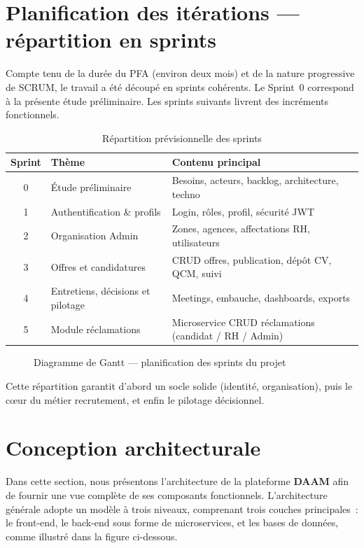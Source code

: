 \section{Planification des itérations --- répartition en sprints}

Compte tenu de la durée du PFA (environ deux mois) et de la nature progressive
de SCRUM, le travail a été découpé en sprints cohérents. Le Sprint~0 correspond
à la présente étude préliminaire. Les sprints suivants livrent des incréments
fonctionnels.

\begin{table}[htbp]
  \centering
  \small
  \caption{Répartition prévisionnelle des sprints}
  \label{tab:sprints-plan}
  \begin{tabular}{|c|p{3.6cm}|p{7.2cm}|}
    \hline
    \textbf{Sprint} & \textbf{Thème} & \textbf{Contenu principal} \\
    \hline
    0 & Étude préliminaire & Besoins, acteurs, backlog, architecture, techno \\
    \hline
    1 & Authentification \& profils & Login, rôles, profil, sécurité JWT \\
    \hline
    2 & Organisation Admin & Zones, agences, affectations RH, utilisateurs \\
    \hline
    3 & Offres et candidatures & CRUD offres, publication, dépôt CV, QCM, suivi \\
    \hline
    4 & Entretiens, décisions et pilotage & Meetings, embauche, dashboards, exports \\
    \hline
    5 & Module réclamations & Microservice CRUD réclamations (candidat / RH / Admin) \\
    \hline
  \end{tabular}
\end{table}

\begin{figure}[htbp]
  \centering
  \caption{Diagramme de Gantt --- planification des sprints du projet}
  \label{fig:gantt-sprints}
\end{figure}

Cette répartition garantit d'abord un socle solide (identité, organisation),
puis le cœur du métier recrutement, et enfin le pilotage décisionnel.


\section{Conception architecturale}

Dans cette section, nous présentons l'architecture de la plateforme \textbf{DAAM}
afin de fournir une vue complète de ses composants fonctionnels.
L'architecture générale adopte un modèle à trois niveaux,
comprenant trois couches principales~: le front-end, le back-end sous forme
de microservices, et les bases de données, comme illustré dans la figure
ci-dessous.

